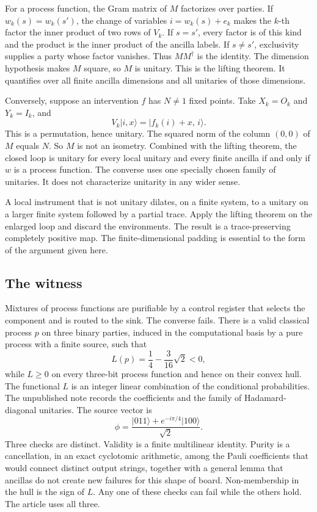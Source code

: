 \documentclass[11pt]{article}
\begin{document}
For a process function, the Gram matrix of \(M\) factorizes over parties. If \(w_k(s)=w_k(s')\), the change of variables \(i = w_k(s)+e_k\) makes the \(k\)-th factor the inner product of two rows of \(V_k\). If \(s=s'\), every factor is of this kind and the product is the inner product of the ancilla labels. If \(s\neq s'\), exclusivity supplies a party whose factor vanishes. Thus \(MM^{\dagger}\) is the identity. The dimension hypothesis makes \(M\) square, so \(M\) is unitary. This is the lifting theorem. It quantifies over all finite ancilla dimensions and all unitaries of those dimensions.

Conversely, suppose an intervention \(f\) has \(N\neq 1\) fixed points. Take \(X_k = O_k\) and \(Y_k = I_k\), and
\[
V_k\lvert i,x\rangle = \lvert f_k(i)+x,\, i\rangle.
\]
This is a permutation, hence unitary. The squared norm of the column \((0,0)\) of \(M\) equals \(N\). So \(M\) is not an isometry. Combined with the lifting theorem, the closed loop is unitary for every local unitary and every finite ancilla if and only if \(w\) is a process function. The converse uses one specially chosen family of unitaries. It does not characterize unitarity in any wider sense.

A local instrument that is not unitary dilates, on a finite system, to a unitary on a larger finite system followed by a partial trace. Apply the lifting theorem on the enlarged loop and discard the environments. The result is a trace-preserving completely positive map. The finite-dimensional padding is essential to the form of the argument given here.

\subsection{The witness}
\label{app:wit}

Mixtures of process functions are purifiable by a control register that selects the component and is routed to the sink. The converse fails. There is a valid classical process \(p\) on three binary parties, induced in the computational basis by a pure process with a finite source, such that
\[
L(p)=\frac14-\frac{3}{16}\sqrt{2}<0,
\]
while \(L\geq 0\) on every three-bit process function and hence on their convex hull. The functional \(L\) is an integer linear combination of the conditional probabilities. The unpublished note records the coefficients and the family of Hadamard-diagonal unitaries. The source vector is
\[
\phi = \frac{\lvert 011\rangle + e^{-i\pi/4}\lvert 100\rangle}{\sqrt{2}}.
\]
Three checks are distinct. Validity is a finite multilinear identity. Purity is a cancellation, in an exact cyclotomic arithmetic, among the Pauli coefficients that would connect distinct output strings, together with a general lemma that ancillas do not create new failures for this shape of board. Non-membership in the hull is the sign of \(L\). Any one of these checks can fail while the others hold. The article uses all three.
\end{document}
